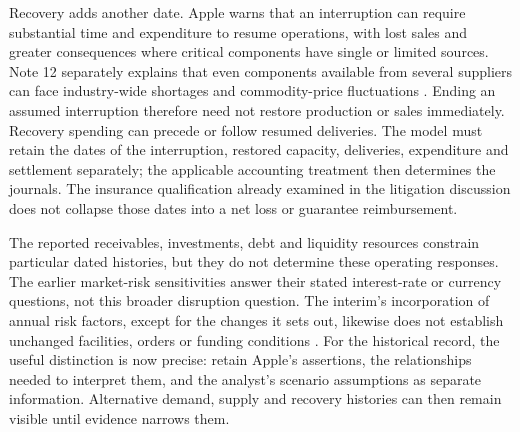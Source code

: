 Recovery adds another date. Apple warns that an interruption can require
substantial time and expenditure to resume operations, with lost sales and
greater consequences where critical components have single or limited sources.
Note 12 separately explains that even components available from several
suppliers can face industry-wide shortages and commodity-price fluctuations
\citep[Note 12, printed p.~46]{apple2024}. Ending an assumed interruption
therefore need not restore production or sales immediately. Recovery spending
can precede or follow resumed deliveries. The model must retain the dates of
the interruption, restored capacity, deliveries, expenditure and settlement
separately; the applicable accounting treatment then determines the journals.
The insurance qualification already examined in the litigation discussion
does not collapse those dates into a net loss or guarantee reimbursement.

The reported receivables, investments, debt and liquidity resources constrain
particular dated histories, but they do not determine these operating
responses. The earlier market-risk sensitivities answer their stated
interest-rate or currency questions, not this broader disruption question.
The interim's incorporation of annual risk factors, except for the changes it
sets out, likewise does not establish unchanged facilities, orders or funding
conditions \citep[Part II, Item 1A, printed p.~19]{apple2025q1}.
For the historical record, the useful distinction is now precise: retain
Apple's assertions, the relationships needed to interpret them, and the
analyst's scenario assumptions as separate information. Alternative demand,
supply and recovery histories can then remain visible until evidence narrows
them.
